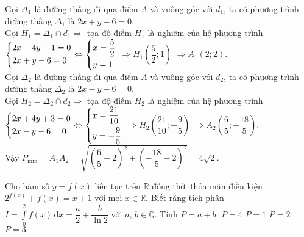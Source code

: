 \begin{ex}
{		Gọi $\Delta_1$ là đường thẳng đi qua điểm $A$ và vuông góc với $d_1$, ta có phương trình đường thẳng $\Delta_1$ là $2x+y-6=0$.\\
		Gọi $H_1=\Delta_1 \cap d_1 \Rightarrow$ tọa độ điểm $H_1$ là nghiệm của hệ phương trình $\left\{\begin{aligned}&2x-4y-1=0 \\ &2x+y-6=0\end{aligned}\right. \Leftrightarrow \left\{\begin{aligned}&x=\dfrac{5}{2} \\ &y=1\end{aligned}\right.$ $\Rightarrow H_1\left(\dfrac{5}{2};1\right)$ $\Rightarrow A_1(2;2)$.\\
		Gọi $\Delta_2$ là đường thẳng đi qua điểm $A$ và vuông góc với $d_2$, ta có phương trình đường thẳng $\Delta_2$ là $2x-y-6=0$.\\
		Gọi $H_2=\Delta_2 \cap d_2 \Rightarrow$ tọa độ điểm $H_2$ là nghiệm của hệ phương trình $\left\{\begin{aligned}&2x+4y+3=0 \\ &2x-y-6=0\end{aligned}\right. \Leftrightarrow \left\{\begin{aligned}&x=\dfrac{21}{10} \\ &y=-\dfrac{9}{5}\end{aligned}\right.$ $\Rightarrow H_2\left(\dfrac{21}{10};-\dfrac{9}{5}\right)$ $\Rightarrow A_2\left(\dfrac{6}{5};-\dfrac{18}{5}\right)$.\\
		Vậy $P_{\text{min}}=A_1A_2=\sqrt{\left(\dfrac{6}{5}-2\right)^2+\left(-\dfrac{18}{5}-2\right)^2}=4\sqrt{2}$.
}
\end{ex}

\begin{ex}%
Cho hàm số $y=f(x)$ liên tục trên $\mathbb{R}$ đồng thời thỏa mãn điều kiện $2^{f(x)}+f(x)=x+1$ với mọi $x \in \mathbb{R}$. Biết rằng tích phân $I=\displaystyle\int\limits_0^2f(x)\mathrm{\,d}x=\dfrac{a}{2}+\dfrac{b}{\ln 2}$ với $a$, $b \in \mathbb{Q}$. Tính $P=a+b$.
\choice
{\True $P=4$}
{$P=1$}
{$P=2$}
{$P=3$}
\end{ex}

